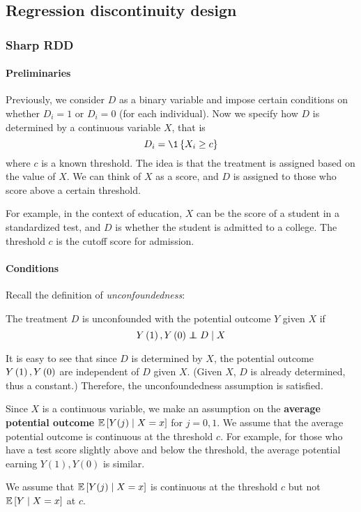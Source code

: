 \subsection{Regression discontinuity design}
\subsubsection{Sharp RDD}
\paragraph{Preliminaries}
Previously, we consider $D$ as a binary variable and impose certain conditions
on whether $D_i=1$ or $D_i=0$ (for each individual). Now we specify how $D$ is
determined by a continuous variable $X$, that is $$D_i=\1\set{X_i\ge c}$$ where
$c$ is a known threshold. The idea is that the treatment is assigned based on
the value of $X$. We can think of $X$ as a score, and $D$ is assigned to those
who score above a certain threshold.

For example, in the context of education, $X$ can be the score of a student in
a standardized test, and $D$ is whether the student is admitted to a college.
The threshold $c$ is the cutoff score for admission.

\paragraph{Conditions}
Recall the definition of \emph{unconfoundedness}:
\begin{definition}[unconfoundedness]
    The treatment $D$ is unconfounded with the potential outcome $Y$ given $X$ if
    \begin{equation*}
        Y\left(1\right),Y\left(0\right)\perp\!\!\!\!\perp D\mid X
    \end{equation*}
\end{definition}

It is easy to see that since $D$ is determined by $X$, the potential outcome
$Y\left(1\right),Y\left(0\right)$ are independent of $D$ given $X$. (Given $X$, $D$ is already
determined, thus a constant.) Therefore, the unconfoundedness assumption is
satisfied.

Since $X$ is a continuous variable, we make an assumption on the
\textbf{average potential outcome} $\mathbb{E}\left[Y(j)\mid X=x\right]$ for $j=0,1$. We
assume that the average potential outcome is continuous at the threshold $c$.
For example, for those who have a test score slightly above and below the
threshold, the average potential earning $Y(1),Y(0)$ is similar.
\begin{remark}
    We assume that $\mathbb{E}\left[Y(j)\mid X=x\right]$ is continuous at the threshold $c$ but not $\mathbb{E}\left[Y\mid X=x\right]$ at $c$.
\end{remark}

